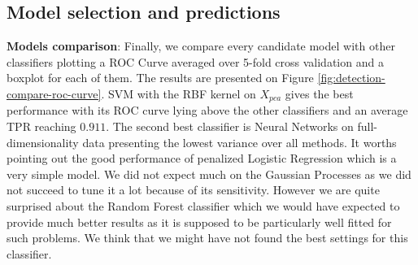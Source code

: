 \documentclass[10pt,a4paper]{article}
\begin{document}
  \subsection{Model selection and predictions}
    \textbf{Models comparison}:  Finally, we compare every candidate model with other classifiers plotting a ROC Curve averaged over 5-fold cross validation and a boxplot for each of them. The results are presented on Figure \ref{fig:detection-compare-roc-curve}. SVM with the RBF kernel on $X_{pca}$ gives the best performance with its ROC curve lying above the other classifiers and an average TPR reaching $0.911$. The second best classifier is Neural Networks on full-dimensionality data presenting the lowest variance over all methods. It worths pointing out the good performance of penalized Logistic Regression which is a very simple model. We did not expect much on the Gaussian Processes as we did not succeed to tune it a lot because of its sensitivity. However we are quite surprised about the Random Forest classifier which we would have expected to provide much better results as it is supposed to be particularly well fitted for such problems. We think that we might have not found the best settings for this classifier.
\end{document}

